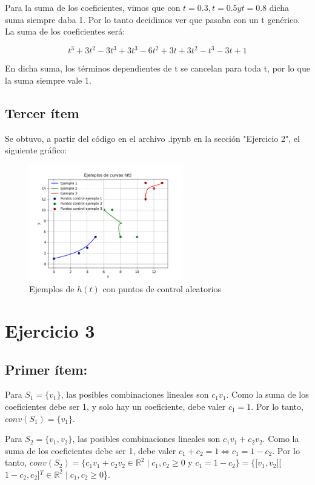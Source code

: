 \documentclass{article}
\begin{document}
Para la suma de los coeficientes, vimos que con $t=0.3, t=0.5 y t=0.8$ dicha suma siempre daba 1. Por lo tanto decidimos ver que pasaba con un t genérico. La suma de los coeficientes será:

$$
t^3 + 3t^2-3t^3 + 3t^3-6t^2+3t +3t^2-t^3-3t+1
$$

En dicha suma, los términos dependientes de t se cancelan para toda t, por lo que la suma siempre vale 1.

\subsection*{Tercer ítem}
Se obtuvo, a partir del código en el archivo .ipynb en la sección "Ejercicio 2", el siguiente gráfico:

\begin{figure}[H]
    \centering
    \includegraphics[width=0.6\textwidth]{imagenes/graf_2c.png}
    \caption{Ejemplos de $h(t)$ con puntos de control aleatorios}
    \label{fig:ejemplo}
\end{figure}

\section*{Ejercicio 3}

\subsection*{Primer ítem:}
Para $S_1 = \{v_1\}$, las posibles combinaciones lineales son $c_1 v_1$. Como la suma de los coeficientes debe ser 1, y solo hay un coeficiente, debe valer $c_1 = 1$. Por lo tanto, $conv(S_1) = \{v_1\}$.
 
Para $S_2 = \{v_1, v_2\}$, las posibles combinaciones lineales son $c_1 v_1 + c_2 v_2$. Como la suma de los coeficientes debe ser 1, debe valer $c_1 + c_2= 1 \iff c_1 = 1 - c_2$. Por lo tanto, $conv(S_2) = \{c_1 v_1+ c_2 v_2 \in \mathbb{R}^2 \mid c_1, c_2 \geq 0$ y $ c_1 = 1- c_2\} = \{$[$v_1, v_2$][$1-c_2, c_2$]$^T \in \mathbb{R}^2 \mid c_1, c_2 \geq 0$\}.
\end{document}
